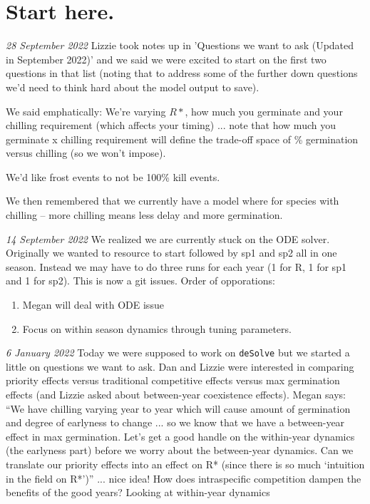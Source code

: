 \documentclass[11pt,letter]{article}
\begin{document}
\section{Start here.} 

\emph{28 September 2022}
Lizzie took notes up in 'Questions we want to ask (Updated in September 2022)' and we said we were excited to start on the first two questions in that list (noting that to address some of the further down questions we'd need to think hard about the model output to save). 

We said emphatically: We're varying $R*$, how much you germinate and your chilling requirement (which affects your timing) ... note that how much you germinate x chilling requirement will define the trade-off space of \% germination versus chilling (so we won't impose). 

We'd like frost events to not be 100\% kill events. 

We then remembered that we currently have a model where  for species with chilling -- more chilling means less delay and more germination. 

\emph{14 September 2022}
We realized we are currently stuck on the ODE solver. Originally we wanted to resource to start followed by sp1 and sp2 all in one season. Instead we may have to do three runs for each year (1 for R, 1 for sp1 and 1 for sp2). This is now a git issues. Order of opporations:
\begin{enumerate}
\item Megan will deal with ODE issue
\item Focus on within season dynamics through tuning parameters.
\end{enumerate}
\emph{6 January 2022} Today we were supposed to work on \verb|deSolve| but we started a little on questions we want to ask. Dan and Lizzie were interested in comparing priority effects versus traditional competitive effects versus max germination effects (and Lizzie asked about between-year coexistence effects). Megan says: ``We have chilling varying year to year which will cause amount of germination and degree of earlyness to change ... so we know that we have a between-year effect in max germination. Let's get a good handle on the within-year dynamics (the earlyness part) before we worry about the between-year dynamics. Can we translate our priority effects into an effect on R* (since there is so much `intuition in the field on R*')'' ... nice idea! How does intraspecific competition dampen the benefits of the good years? Looking at within-year dynamics \\
\end{document}
